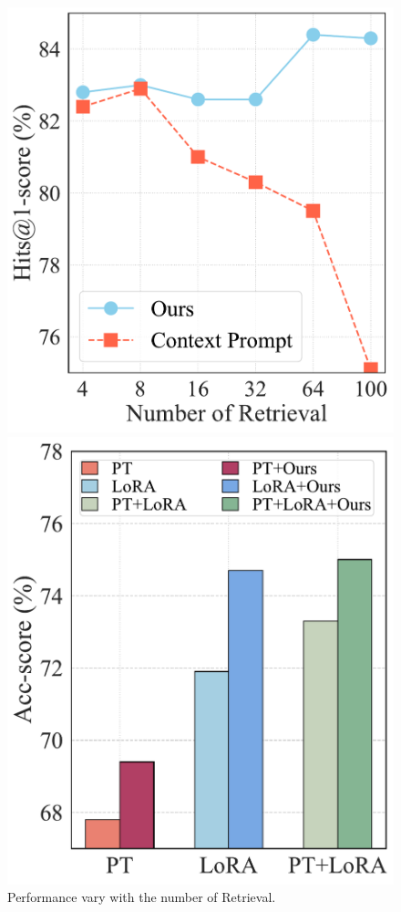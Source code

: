 \begin{figure}[t]
\centering
\begin{minipage}[c]{0.225\textwidth}
    \centering
    \includegraphics[width=\textwidth]{img/hyperparamter.pdf}
    \caption{Performance vary with the number of Retrieval.}
    \label{fig:topk}
\end{minipage}
\begin{minipage}[c]{0.225\textwidth}
    \centering
    \includegraphics[width=\textwidth]{img/bar.pdf}

\end{minipage}
\end{figure}
